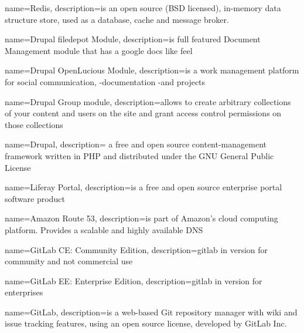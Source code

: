 
{
	name={Redis},
	description={is an open source (BSD licensed), in-memory data structure store, used as a database, cache and message broker. \cite{bib:redis}}
}

{
	name={Drupal filedepot Module},
	description={is full featured Document Management module that has a google docs like feel \cite{bib:drupal-module-filedepot}}
}

{
	name={Drupal OpenLucious Module},
	description={is a work management platform for social communication, -documentation -and projects \cite{bib:drupal-module-openlucious}}
}


{
	name={Drupal Group module},
	description={allows to create arbitrary collections of your content and users on the site and grant access control permissions on those collections \cite{bib:drupal-module-group}}
}

{
	name={Drupal},
	description={ a free and open source content-management framework written in PHP and distributed under the GNU General Public License}
}

{
	name={Liferay Portal},
	description={is a free and open source enterprise portal software product}
}

{
	name={Amazon Route 53},
	description={is part of Amazon's cloud computing platform. Provides a scalable and highly available \gls{DNS}}
}

{
	name={GitLab CE: Community Edition},
	description={\gls{gitlab} in version for community and not commercial use}
}

{
	name={GitLab EE: Enterprise Edition},
	description={\gls{gitlab} in version for enterprises}
}

{
	name={GitLab},
	description={is a web-based Git repository manager with wiki and issue tracking features, using an open source license, developed by GitLab Inc. \cite{bib:gitlab-wiki}}
}


